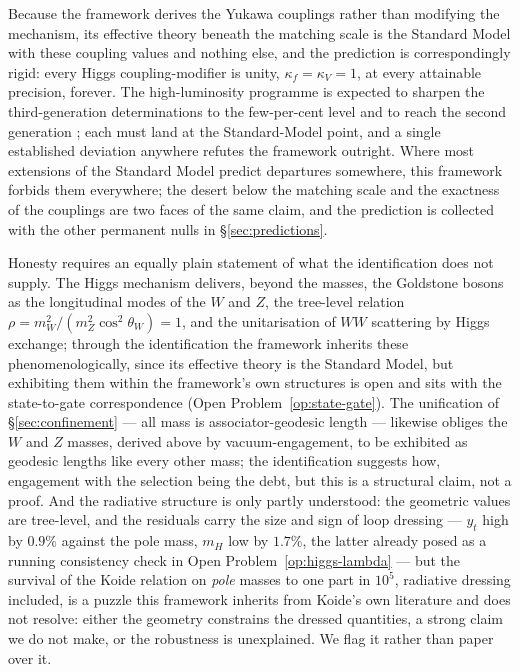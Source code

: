 Because the framework derives the Yukawa couplings rather than modifying the mechanism, its
effective theory beneath the matching scale is the Standard Model with these coupling values and
nothing else, and the prediction is correspondingly rigid: every Higgs coupling-modifier is unity,
$\kappa_f = \kappa_V = 1$, at every attainable precision, forever. The high-luminosity programme is
expected to sharpen the third-generation determinations to the few-per-cent level and to reach the
second generation \autocite{cepeda2019hllhc}; each must land at the Standard-Model point, and a
single established deviation anywhere refutes the framework outright. Where most extensions of the
Standard Model predict departures somewhere, this framework forbids them everywhere; the desert below
the matching scale and the exactness of the couplings are two faces of the same claim, and the
prediction is collected with the other permanent nulls in \S\ref{sec:predictions}.

Honesty requires an equally plain statement of what the identification does not supply. The Higgs
mechanism delivers, beyond the masses, the Goldstone bosons as the longitudinal modes of the $W$ and
$Z$, the tree-level relation $\rho = m_W^2/(m_Z^2\cos^2\theta_W) = 1$, and the unitarisation of
$WW$ scattering by Higgs exchange; through the identification the framework inherits these
phenomenologically, since its effective theory is the Standard Model, but exhibiting them within the
framework's own structures is open and sits with the state-to-gate correspondence
(Open Problem~\ref{op:state-gate}). The unification of \S\ref{sec:confinement} --- all mass is
associator-geodesic length --- likewise obliges the $W$ and $Z$ masses, derived above by
vacuum-engagement, to be exhibited as geodesic lengths like every other mass; the identification
suggests how, engagement with the selection being the debt, but this is a structural claim, not a
proof. And the radiative structure is only partly understood: the geometric values are tree-level,
and the residuals carry the size and sign of loop dressing --- $y_t$ high by $0.9\%$ against the pole
mass, $m_H$ low by $1.7\%$, the latter already posed as a running consistency check in
Open Problem~\ref{op:higgs-lambda} --- but the survival of the Koide relation on \emph{pole} masses
to one part in $10^5$, radiative dressing included, is a puzzle this framework inherits from Koide's
own literature and does not resolve: either the geometry constrains the dressed quantities, a strong
claim we do not make, or the robustness is unexplained. We flag it rather than paper over it.

